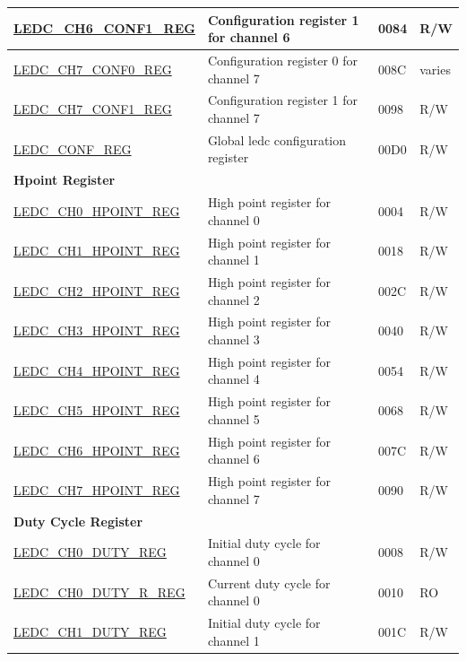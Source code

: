 \begin{longtable}{ | p{6cm} | p{7.2cm} | p{1.3cm} | p{1cm} | }
\hyperref[regdesc:LEDCCHNCONF1REG]{LEDC\_CH6\_CONF1\_REG} & Configuration register 1 for channel 6 & \hexprefix{}0084 & R/W \\ \hline
\hyperref[regdesc:LEDCCHNCONF0REG]{LEDC\_CH7\_CONF0\_REG} & Configuration register 0 for channel 7 & \hexprefix{}008C & varies \\ \hline
\hyperref[regdesc:LEDCCHNCONF1REG]{LEDC\_CH7\_CONF1\_REG} & Configuration register 1 for channel 7 & \hexprefix{}0098 & R/W \\ \hline
\hyperref[regdesc:LEDCCONFREG]{LEDC\_CONF\_REG} & Global ledc configuration register & \hexprefix{}00D0 & R/W \\ \hline
\multicolumn{4}{|l|}{\textbf{Hpoint Register}} \\ \hline
\hyperref[regdesc:LEDCCHNHPOINTREG]{LEDC\_CH0\_HPOINT\_REG} & High point register for channel 0 & \hexprefix{}0004 & R/W \\ \hline
\hyperref[regdesc:LEDCCHNHPOINTREG]{LEDC\_CH1\_HPOINT\_REG} & High point register for channel 1 & \hexprefix{}0018 & R/W \\ \hline
\hyperref[regdesc:LEDCCHNHPOINTREG]{LEDC\_CH2\_HPOINT\_REG} & High point register for channel 2 & \hexprefix{}002C & R/W \\ \hline
\hyperref[regdesc:LEDCCHNHPOINTREG]{LEDC\_CH3\_HPOINT\_REG} & High point register for channel 3 & \hexprefix{}0040 & R/W \\ \hline
\hyperref[regdesc:LEDCCHNHPOINTREG]{LEDC\_CH4\_HPOINT\_REG} & High point register for channel 4 & \hexprefix{}0054 & R/W \\ \hline
\hyperref[regdesc:LEDCCHNHPOINTREG]{LEDC\_CH5\_HPOINT\_REG} & High point register for channel 5 & \hexprefix{}0068 & R/W \\ \hline
\hyperref[regdesc:LEDCCHNHPOINTREG]{LEDC\_CH6\_HPOINT\_REG} & High point register for channel 6 & \hexprefix{}007C & R/W \\ \hline
\hyperref[regdesc:LEDCCHNHPOINTREG]{LEDC\_CH7\_HPOINT\_REG} & High point register for channel 7 & \hexprefix{}0090 & R/W \\ \hline
\multicolumn{4}{|l|}{\textbf{Duty Cycle Register}} \\ \hline
\hyperref[regdesc:LEDCCHNDUTYREG]{LEDC\_CH0\_DUTY\_REG} & Initial duty cycle for channel 0 & \hexprefix{}0008 & R/W \\ \hline
\hyperref[regdesc:LEDCCHNDUTYRREG]{LEDC\_CH0\_DUTY\_R\_REG} & Current duty cycle for channel 0 & \hexprefix{}0010 & RO \\ \hline
\hyperref[regdesc:LEDCCHNDUTYREG]{LEDC\_CH1\_DUTY\_REG} & Initial duty cycle for channel 1 & \hexprefix{}001C & R/W \\ \hline

\end{longtable}
